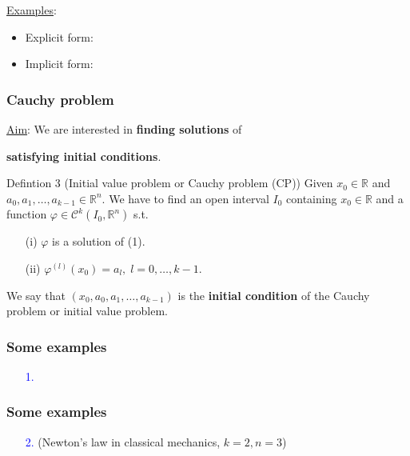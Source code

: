 \documentclass[10pt]{beamer}
\newcommand{\R}{\mathbb{R}}
\begin{document}
{\begin{frame}
\vspace{0.5cm}
\underline{Examples}:\\
\vspace{0.2cm}
\begin {itemize}
\item Explicit form:\\
\vspace{0.2cm}
\item Implicit form:
\end{itemize}
\end{frame}

\begin{frame} \frametitle{Cauchy problem}
\underline{Aim}: We are interested in \textbf{finding solutions} of
\begin{block}{}
\vspace{0.5cm}
\end{block}
\textbf{satisfying initial conditions}.

\begin{alertblock}{Defintion 3 (Initial value problem or Cauchy problem (CP))}
Given $x_0\in \R$ and $a_0,a_1, \dots, a_{k-1} \in \R^n$. We have to find an open interval $I_0$ containing $x_0 \in \R$ and a function $\varphi \in \mathcal{C}^k(I_0,\R^n)$ s.t.
\begin{itemize}
\item[(i)] $\varphi$ is a solution of (1).
\item[(ii)] $\varphi^{(l)}(x_0)=a_l,\; l=0, \dots,k-1$.
\end{itemize}
We say that $(x_0,a_0,a_1, \dots, a_{k-1})$ is the \textbf{initial condition} of the Cauchy problem or initial value problem.
\end{alertblock}
\end{frame}


\begin{frame} \frametitle{Some examples}
\begin{itemize}
\item[\textcolor{blue}{1.}]\; \\
\vspace{7cm}
\end{itemize}
\end{frame}

\begin{frame} \frametitle{Some examples}
\begin{itemize}
\item[\textcolor{blue}{2.}] (Newton's law in classical mechanics, $k=2,n=3$)\\
\vspace{7cm}
\end{itemize}
\end{frame}



}
\end{document}
